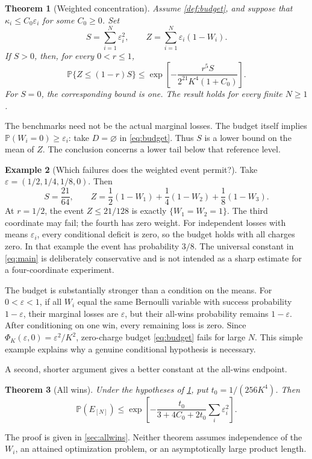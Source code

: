 \documentclass[11pt,reqno]{amsart}
\numberwithin{equation}{section}
\newtheorem{theorem}{Theorem}[section]
\theoremstyle{definition}
\newtheorem{example}[theorem]{Example}
\theoremstyle{remark}
\newcommand{\Pp}{\mathbb P}
\newcommand{\eps}{\varepsilon}
\newcommand{\PhiK}{\Phi_K}
\begin{document}
\begin{theorem}[Weighted concentration]\label{thm:main}
Assume \cref{def:budget}, and suppose that
\(\kappa_i\le C_0\eps_i\) for some \(C_0\ge0\). Set
\[
 S=\sum_{i=1}^N\eps_i^2,\qquad
 Z=\sum_{i=1}^N\eps_i(1-W_i).
\]
If \(S>0\), then, for every \(0<r\le1\),
\begin{equation}\label{eq:main}
 \Pp\{Z\le(1-r)S\}
 \le \exp\left[-\frac{r^5S}{2^{21}K^4(1+C_0)}\right].
\end{equation}
For \(S=0\), the corresponding bound is one. The result holds for every finite \(N\ge1\).
\end{theorem}

The benchmarks need not be the actual marginal losses. The budget itself implies \(\Pp(W_i=0)\ge\eps_i\): take \(D=\varnothing\) in \eqref{eq:budget}. Thus \(S\) is a lower bound on the mean of \(Z\). The conclusion concerns a lower tail below that reference level.

\begin{example}[Which failures does the weighted event permit?]\label{ex:weights}
Take \(\eps=(1/2,1/4,1/8,0)\). Then
\[
 S=\frac{21}{64},\qquad
 Z=\frac12(1-W_1)+\frac14(1-W_2)+\frac18(1-W_3).
\]
At \(r=1/2\), the event \(Z\le21/128\) is exactly
\(\{W_1=W_2=1\}\). The third coordinate may fail; the fourth has zero weight. For independent losses with means \(\eps_i\), every conditional deficit is zero, so the budget holds with all charges zero. In that example the event has probability \(3/8\). The universal constant in \eqref{eq:main} is deliberately conservative and is not intended as a sharp estimate for a four-coordinate experiment.
\end{example}

The budget is substantially stronger than a condition on the means. For \(0<\eps<1\), if all \(W_i\) equal the same Bernoulli variable with success probability \(1-\eps\), their marginal losses are \(\eps\), but their all-wins probability remains \(1-\eps\). After conditioning on one win, every remaining loss is zero. Since \(\PhiK(\eps,0)=\eps^2/K^2\), zero-charge budget \eqref{eq:budget} fails for large \(N\). This simple example explains why a genuine conditional hypothesis is necessary.

A second, shorter argument gives a better constant at the all-wins endpoint.
\begin{theorem}[All wins]\label{thm:allwins}
Under the hypotheses of \cref{thm:main}, put \(t_0=1/(256K^4)\). Then
\begin{equation}\label{eq:allwins}
 \Pp(E_{[N]})\le
 \exp\left[-\frac{t_0}{3+4C_0+2t_0}\sum_i\eps_i^2\right].
\end{equation}
\end{theorem}
The proof is given in \cref{sec:allwins}. Neither theorem assumes independence of the \(W_i\), an attained optimization problem, or an asymptotically large product length.
\end{document}
